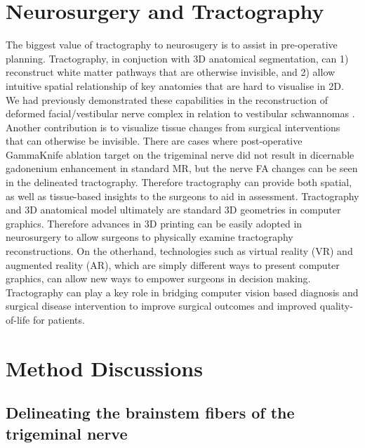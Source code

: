 \section{Neurosurgery and Tractography}

The biggest value of tractography to neurosugery is to assist in pre-operative planning. Tractography, in conjuction with 3D anatomical segmentation, can 1) reconstruct white matter pathways that are otherwise invisible, and 2) allow intuitive spatial relationship of key anatomies that are hard to visualise in 2D. We had previously demonstrated these capabilities in the reconstruction of deformed facial/vestibular nerve complex in relation to vestibular schwannomas \cite{Chen2011b,Behan2017}.
Another contribution is to visualize tissue changes from surgical interventions that can otherwise be invisible. There are cases where post-operative GammaKnife ablation target on the trigeminal nerve did not result in dicernable gadonenium enhancement in standard MR, but the nerve FA changes can be seen in the delineated tractography. Therefore tractography can provide both spatial, as well as tissue-based insights to the surgeons to aid in assessment.
Tractography and 3D anatomical model ultimately are standard 3D geometries in computer graphics. Therefore advances in 3D printing can be easily adopted in neurosurgery to allow surgeons to physically examine tractography reconstructions. On the otherhand, technologies such as virtual reality (VR) and augmented reality (AR), which are simply different ways to present computer graphics, can allow new ways to empower surgeons in decision making. Tractography can play a key role in bridging computer vision based diagnosis and surgical disease intervention to improve surgical outcomes and improved quality-of-life for patients.    


\section{Method Discussions}

\subsection{Delineating the brainstem fibers of the trigeminal nerve}

